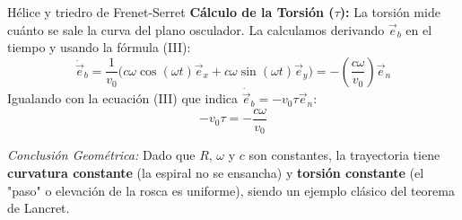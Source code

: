 \begin{solucion}{Hélice y triedro de Frenet-Serret}
\textbf{Cálculo de la Torsión ($\tau$):}
La torsión mide cuánto se sale la curva del plano osculador. La calculamos derivando $\vec{e}_b$ en el tiempo y usando la fórmula (III):
$$\dot{\vec{e}}_b = \frac{1}{v_0} \Big( c\omega\cos(\omega t)\vec{e}_x + c\omega\sin(\omega t)\vec{e}_y \Big) = -\left(\frac{c\omega}{v_0}\right) \vec{e}_n$$
Igualando con la ecuación (III) que indica $\dot{\vec{e}}_b = -v_0 \tau \vec{e}_n$:
$$-v_0 \tau = -\frac{c\omega}{v_0}$$

\textit{Conclusión Geométrica:} Dado que $R$, $\omega$ y $c$ son constantes, la trayectoria tiene \textbf{curvatura constante} (la espiral no se ensancha) y \textbf{torsión constante} (el "paso" o elevación de la rosca es uniforme), siendo un ejemplo clásico del teorema de Lancret.
\end{solucion}
